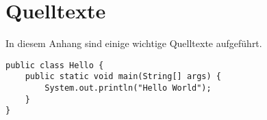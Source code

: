 \chapter{Quelltexte}

In diesem Anhang sind einige wichtige Quelltexte aufgeführt.

\begin{lstlisting}[caption={Zeilencode}]
public class Hello {
    public static void main(String[] args) {
        System.out.println("Hello World");
    }
}
\end{lstlisting}
